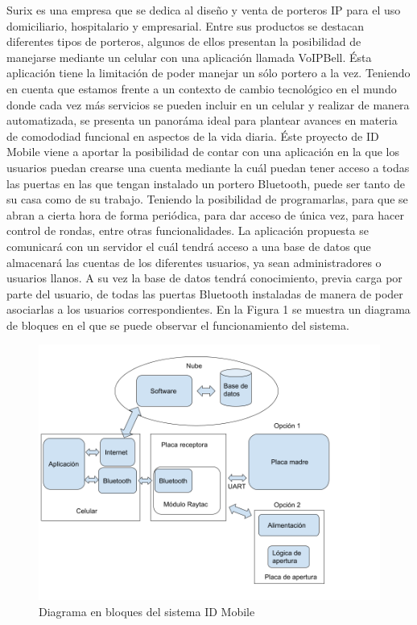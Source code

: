 \documentclass[11pt]{charter}
\begin{document}
Surix es una empresa que se dedica al diseño y venta de porteros IP para el uso domiciliario, hospitalario y empresarial. 
Entre sus productos se destacan diferentes tipos de porteros, algunos de ellos presentan la posibilidad de manejarse mediante un celular con una aplicación llamada VoIPBell. Ésta aplicación tiene la limitación de poder manejar un sólo portero a la vez. \newline
Teniendo en cuenta que estamos frente a un contexto de cambio tecnológico en el mundo donde cada vez más servicios se pueden incluir en un celular y realizar de manera automatizada, se presenta un panoráma ideal para plantear avances en materia de comododiad funcional en aspectos de la vida diaria. \newline
Éste proyecto de ID Mobile viene a aportar la posibilidad de contar con una aplicación en la que los usuarios puedan crearse una cuenta mediante la cuál puedan tener acceso a todas las puertas en las que tengan instalado un portero Bluetooth, puede ser tanto de su casa como de su trabajo. Teniendo la posibilidad de programarlas, para que se abran a cierta hora de forma periódica, para dar acceso de única vez, para hacer control de rondas, entre otras funcionalidades. La aplicación propuesta se comunicará con un servidor el cuál tendrá acceso a una base de datos que almacenará las cuentas de los diferentes usuarios, ya sean administradores o usuarios llanos. A su vez la base de datos tendrá conocimiento, previa carga por parte del usuario, de todas las puertas Bluetooth instaladas de manera de poder asociarlas a los usuarios correspondientes. En la Figura 1 se muestra un diagrama de bloques en el que se puede observar el funcionamiento del sistema. 

\vspace{25px}

\begin{figure}[htpb]
\centering 
\includegraphics[width=.9\textwidth]{./Figuras/Diagramadebloques_planificacion.png}
\caption{Diagrama en bloques del sistema ID Mobile}
\label{fig:diagBloques}
\end{figure}
\end{document}
